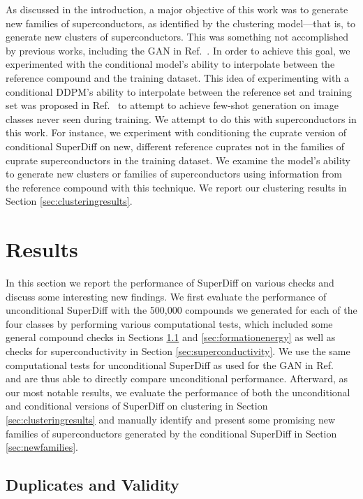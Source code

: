 \documentclass[%
reprint,
 amsmath,amssymb,
 aps,
prb,
]{revtex4-2}
\begin{document}
As discussed in the introduction, a major objective of this work was to generate new families of superconductors, as identified by the clustering model---that is, to generate new clusters of superconductors. This was something not accomplished by previous works, including the GAN in Ref.~\cite{Kim_2024}. In order to achieve this goal, we experimented with the conditional model's ability to interpolate between the reference compound and the training dataset. This idea of experimenting with a conditional DDPM's ability to interpolate between the reference set and training set was proposed in Ref.~\cite{giannone2022fewshot} to attempt to achieve few-shot generation on image classes never seen during training. We attempt to do this with superconductors in this work. For instance, we experiment with conditioning the cuprate version of conditional SuperDiff on new, different reference cuprates not in the families of cuprate superconductors in the training dataset. We examine the model's ability to generate new clusters or families of superconductors using information from the reference compound with this technique. We report our clustering results in Section \ref{sec:clusteringresults}.



\section{Results}
\label{results}

In this section we report the performance of SuperDiff on various checks and discuss some interesting new findings. We first evaluate the performance of unconditional SuperDiff with the 500,000 compounds we generated for each of the four classes by performing various computational tests, which included some general compound checks in Sections \ref{sec:resultsDNV} and \ref{sec:formationenergy} as well as checks for superconductivity in Section \ref{sec:superconductivity}. We use the same computational tests for unconditional SuperDiff as used for the GAN in Ref.~\cite{Kim_2024} and are thus able to directly compare unconditional performance. Afterward, as our most notable results, we evaluate the performance of both the unconditional and conditional versions of SuperDiff on clustering in Section \ref{sec:clusteringresults} and manually identify and present some promising new families of superconductors generated by the conditional SuperDiff in Section \ref{sec:newfamilies}.


\subsection{Duplicates and Validity}
\label{sec:resultsDNV}
\end{document}
